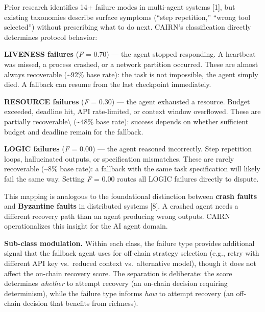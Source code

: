 \documentclass[
  10pt,
]{article}
\begin{document}
Prior research identifies 14+ failure modes in multi-agent systems
{[}1{]}, but existing taxonomies describe surface symptoms (``step
repetition,'' ``wrong tool selected'') without prescribing what to do
next. CAIRN's classification directly determines protocol behavior:

\textbf{LIVENESS failures} (\emph{F} = 0.70) --- the agent stopped
responding. A heartbeat was missed, a process crashed, or a network
partition occurred. These are almost always recoverable
(\textasciitilde92\% base rate): the task is not impossible, the agent
simply died. A fallback can resume from the last checkpoint immediately.

\textbf{RESOURCE failures} (\emph{F} = 0.30) --- the agent exhausted a
resource. Budget exceeded, deadline hit, API rate-limited, or context
window overflowed. These are partially recoverable\textbackslash{}
(\textasciitilde48\% base rate): success depends on whether sufficient
budget and deadline remain for the fallback.

\textbf{LOGIC failures} (\emph{F} = 0.00) --- the agent reasoned
incorrectly. Step repetition loops, hallucinated outputs, or
specification mismatches. These are rarely recoverable
(\textasciitilde8\% base rate): a fallback with the same task
specification will likely fail the same way. Setting \emph{F} = 0.00
routes all LOGIC failures directly to dispute.

This mapping is analogous to the foundational distinction between
\textbf{crash faults} and \textbf{Byzantine faults} in distributed
systems {[}8{]}. A crashed agent needs a different recovery path than an
agent producing wrong outputs. CAIRN operationalizes this insight for
the AI agent domain.

\textbf{Sub-class modulation.} Within each class, the failure type
provides additional signal that the fallback agent uses for off-chain
strategy selection (e.g., retry with different API key vs.~reduced
context vs.~alternative model), though it does not affect the on-chain
recovery score. The separation is deliberate: the score determines
\emph{whether} to attempt recovery (an on-chain decision requiring
determinism), while the failure type informs \emph{how} to attempt
recovery (an off-chain decision that benefits from richness).
\end{document}
